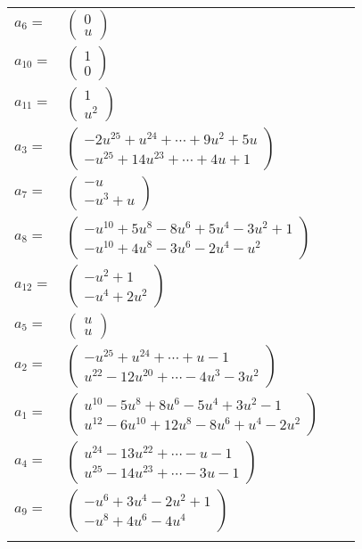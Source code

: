 \documentclass[1p]{elsarticle_modified}
\theoremstyle{definition}
\begin{document}
\begin{tabular}{m{7pt} m{180pt} m{7pt} m{180pt} }
\flushright $a_{6}=$&$\begin{pmatrix}0\\u\end{pmatrix}$ \\
\flushright $a_{10}=$&$\begin{pmatrix}1\\0\end{pmatrix}$ \\
\flushright $a_{11}=$&$\begin{pmatrix}1\\u^2\end{pmatrix}$ \\
\flushright $a_{3}=$&$\begin{pmatrix}-2 u^{25}+u^{24}+\cdots+9 u^2+5 u\\- u^{25}+14 u^{23}+\cdots+4 u+1\end{pmatrix}$ \\
\flushright $a_{7}=$&$\begin{pmatrix}- u\\- u^3+u\end{pmatrix}$ \\
\flushright $a_{8}=$&$\begin{pmatrix}- u^{10}+5 u^8-8 u^6+5 u^4-3 u^2+1\\- u^{10}+4 u^8-3 u^6-2 u^4- u^2\end{pmatrix}$ \\
\flushright $a_{12}=$&$\begin{pmatrix}- u^2+1\\- u^4+2 u^2\end{pmatrix}$ \\
\flushright $a_{5}=$&$\begin{pmatrix}u\\u\end{pmatrix}$ \\
\flushright $a_{2}=$&$\begin{pmatrix}- u^{25}+u^{24}+\cdots+u-1\\u^{22}-12 u^{20}+\cdots-4 u^3-3 u^2\end{pmatrix}$ \\
\flushright $a_{1}=$&$\begin{pmatrix}u^{10}-5 u^8+8 u^6-5 u^4+3 u^2-1\\u^{12}-6 u^{10}+12 u^8-8 u^6+u^4-2 u^2\end{pmatrix}$ \\
\flushright $a_{4}=$&$\begin{pmatrix}u^{24}-13 u^{22}+\cdots- u-1\\u^{25}-14 u^{23}+\cdots-3 u-1\end{pmatrix}$ \\
\flushright $a_{9}=$&$\begin{pmatrix}- u^6+3 u^4-2 u^2+1\\- u^8+4 u^6-4 u^4\end{pmatrix}$\\&\end{tabular}
\end{document}
